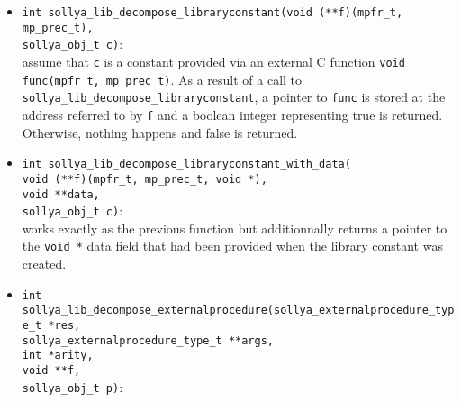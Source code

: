 \documentclass[a4paper]{article}
\newcommand{\sollya}{\texttt{Sollya}\xspace}
\begin{document}
\begin{itemize}
As a result of a call to \verb|sollya_lib_decompose_procedurefunction|, the value $n$ is stored at the address referred to by \verb|deriv|, a \sollya object representing the procedure is stored at the address referred to by \verb|f|, a \sollya object representing $f_1$ is stored at the address referred to by \verb|e|. Please notice that the objects stored in \verb|f| and \verb|e| must manually be cleared once they become useless. Upon success, a boolean integer representing true is returned. If \verb|g| is not a procedure function object, nothing happens and false is returned.
\item \verb|int sollya_lib_decompose_libraryconstant(void (**f)(mpfr_t, mp_prec_t),|\\
\verb|sollya_obj_t c)|:\\
assume that \verb|c| is a constant provided via an external C function \verb|void func(mpfr_t, mp_prec_t)|. As a result of a call to \verb|sollya_lib_decompose_libraryconstant|, a pointer to \verb|func| is stored at the address referred to by \verb|f| and a boolean integer representing true is returned. Otherwise, nothing happens and false is returned.
\item \verb|int sollya_lib_decompose_libraryconstant_with_data(|\\
\verb|void (**f)(mpfr_t, mp_prec_t, void *),|\\
\verb|void **data,|\\
\verb|sollya_obj_t c)|:\\
works exactly as the previous function but additionnally returns a pointer to the \verb|void *| data field that had been provided when the library constant was created.
\item \verb|int sollya_lib_decompose_externalprocedure(sollya_externalprocedure_type_t *res,|\\
\verb|sollya_externalprocedure_type_t **args,|\\
\verb|int *arity,|\\
\verb|void **f,|\\
\verb|sollya_obj_t p)|:\\

\end{itemize}
\end{document}

